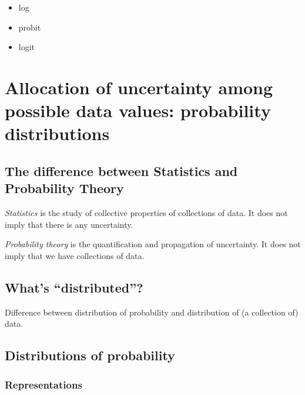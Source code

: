 \documentclass[
  a4paper,
  DIV=11,
  numbers=noendperiod,
  oneside]{scrreprt}
\begin{document}
\begin{itemize}
\item
  log
\item
  probit
\item
  logit
\end{itemize}


\hypertarget{allocation-of-uncertainty-among-possible-data-values-probability-distributions}{%
\chapter{Allocation of uncertainty among possible data values:
probability
distributions}\label{allocation-of-uncertainty-among-possible-data-values-probability-distributions}}

\hypertarget{the-difference-between-statistics-and-probability-theory}{%
\section{The difference between Statistics and Probability
Theory}\label{the-difference-between-statistics-and-probability-theory}}

\emph{Statistics} is the study of collective properties of collections
of data. It does not imply that there is any uncertainty.

\emph{Probability theory} is the quantification and propagation of
uncertainty. It does not imply that we have collections of data.

\hypertarget{whats-distributed}{%
\section{What's ``distributed''?}\label{whats-distributed}}

Difference between distribution of probability and distribution of (a
collection of) data.

\hypertarget{distributions-of-probability}{%
\section{Distributions of
probability}\label{distributions-of-probability}}

\hypertarget{representations}{%
\subsection{Representations}\label{representations}}
\end{document}
